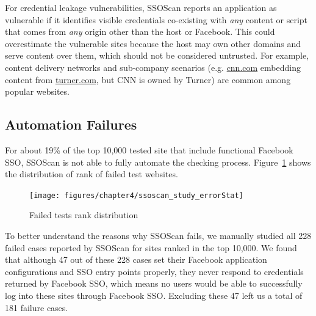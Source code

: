  For credential leakage vulnerabilities, SSOScan reports an application as vulnerable if it identifies visible credentials co-existing with \emph{any} content or script that comes from \emph{any} origin other than the host or Facebook.  This could overestimate the vulnerable sites because the host may own other domains and serve content over them, which should not be considered untrusted.  For example, content delivery networks and sub-company scenarios (e.g. \url{cnn.com} embedding content from \url{turner.com}, but CNN is owned by Turner) are common among popular websites.

\subsection{Automation Failures}
\label{sec:ssoscan_study_automationFailReasons}

For about 19\% of the top 10,000 tested site that include functional Facebook SSO, SSOScan is not able to fully automate the checking process.  Figure~\ref{fig:ssoscan_study_errorStat} shows the distribution of rank of failed test websites.

\begin{figure}[hbt]
\centering
\texttt{[image: figures/chapter4/ssoscan\_study\_errorStat]}
\caption{Failed tests rank distribution}
\label{fig:ssoscan_study_errorStat}
\end{figure}

To better understand the reasons why SSOScan fails, we manually studied all 228 failed cases reported by SSOScan for sites ranked in the top 10,000.  We found that although 47 out of these 228 cases set their Facebook application configurations and SSO entry points properly, they never respond to credentials returned by Facebook SSO, which means no users would be able to successfully log into these sites through Facebook SSO.  Excluding these 47 left us a total of 181 failure cases.

